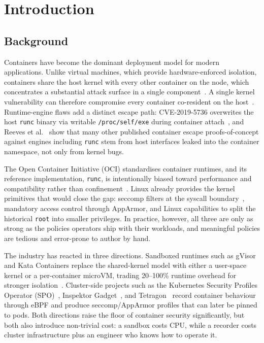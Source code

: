 
\chapter{Introduction}

\section{Background}

Containers have become the dominant deployment model for modern applications. Unlike virtual machines, which provide hardware-enforced isolation, containers share the host kernel with every other container on the node, which concentrates a substantial attack surface in a single component~\cite{wang2023}. A single kernel vulnerability can therefore compromise every container co-resident on the host~\cite{cve2019}. Runtime-engine flaws add a distinct escape path: CVE-2019-5736 overwrites the host \texttt{runc} binary via writable \texttt{/proc/self/exe} during container attach~\cite{cve2019,unit42cve20195736}, and Reeves et al.~\cite{reeves2021runtime} show that many other published container escape proofs-of-concept against engines including \texttt{runc} stem from host interfaces leaked into the container namespace, not only from kernel bugs.

The Open Container Initiative (OCI) standardises container runtimes, and its reference implementation, \texttt{runc}, is intentionally biased toward performance and compatibility rather than confinement~\cite{volpert2024}. Linux already provides the kernel primitives that would close the gap: seccomp filters at the syscall boundary~\cite{lopes2020}, mandatory access control through AppArmor, and Linux capabilities to split the historical \texttt{root} into smaller privileges. In practice, however, all three are only as strong as the policies operators ship with their workloads, and meaningful policies are tedious and error-prone to author by hand.

The industry has reacted in three directions. Sandboxed runtimes such as gVisor and Kata Containers replace the shared-kernel model with either a user-space kernel or a per-container microVM, trading 20--100\% runtime overhead for stronger isolation~\cite{wang2022,viktorsson2020}. Cluster-side projects such as the Kubernetes Security Profiles Operator (SPO)~\cite{spo2025}, Inspektor Gadget~\cite{inspektorgadget2025}, and Tetragon~\cite{tetragon2025} record container behaviour through eBPF and produce seccomp/AppArmor profiles that can later be pinned to pods. Both directions raise the floor of container security significantly, but both also introduce non-trivial cost: a sandbox costs CPU, while a recorder costs cluster infrastructure plus an engineer who knows how to operate it.

